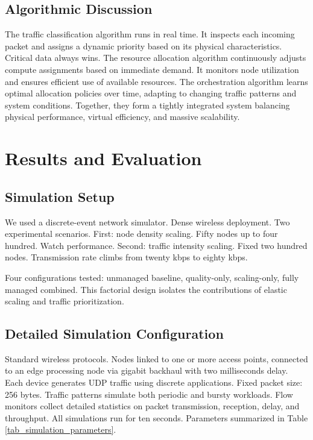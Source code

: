 \documentclass[a4paper,fleqn]{cas-dc}
\numberwithin{equation}{section}
\begin{document}
\subsection{Algorithmic Discussion}

The traffic classification algorithm runs in real time. It inspects each incoming packet and assigns a dynamic priority based on its physical characteristics. Critical data always wins. The resource allocation algorithm continuously adjusts compute assignments based on immediate demand. It monitors node utilization and ensures efficient use of available resources. The orchestration algorithm learns optimal allocation policies over time, adapting to changing traffic patterns and system conditions. Together, they form a tightly integrated system balancing physical performance, virtual efficiency, and massive scalability.

\section{Results and Evaluation}

\subsection{Simulation Setup}

We used a discrete-event network simulator. Dense wireless deployment. Two experimental scenarios. First: node density scaling. Fifty nodes up to four hundred. Watch performance. Second: traffic intensity scaling. Fixed two hundred nodes. Transmission rate climbs from twenty kbps to eighty kbps.

Four configurations tested: unmanaged baseline, quality-only, scaling-only, fully managed combined. This factorial design isolates the contributions of elastic scaling and traffic prioritization.

\subsection{Detailed Simulation Configuration}

Standard wireless protocols. Nodes linked to one or more access points, connected to an edge processing node via gigabit backhaul with two milliseconds delay. Each device generates UDP traffic using discrete applications. Fixed packet size: 256 bytes. Traffic patterns simulate both periodic and bursty workloads. Flow monitors collect detailed statistics on packet transmission, reception, delay, and throughput. All simulations run for ten seconds. Parameters summarized in Table \ref{tab_simulation_parameters}.
\end{document}
